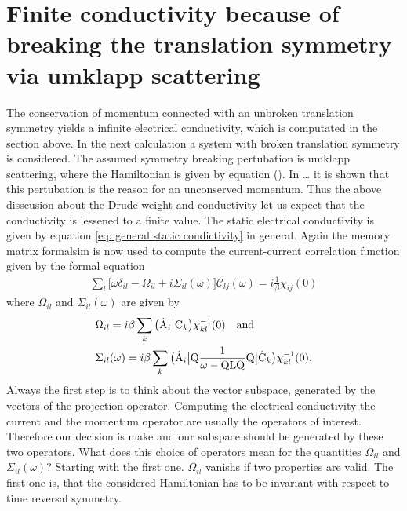 \section{Finite conductivity because of breaking the translation symmetry via umklapp scattering}
\label{sec: finite conductivity because of breaking the translation symmetry via umklapp scattering}
%
%
The conservation of momentum connected with an unbroken translation symmetry yields a infinite electrical conductivity, which is computated in the section above.
In the next calculation a system with broken translation symmetry is considered.
The assumed symmetry breaking pertubation is umklapp scattering, where the Hamiltonian is given by equation ().
In \dots{} it is shown that this pertubation is the reason for an unconserved momentum.
Thus the above disscusion about the Drude weight and conductivity let us expect that the conductivity is lessened to a finite value.
The static electrical conductivity is given by equation \eqref{eq: general static condictivity} in general.
Again the memory matrix formalsim is now used to compute the current-current correlation function given by the formal equation
%
\begin{align}
	\sum\limits_{l} \Big[\omega \delta_{il} - \Omega_{il} + i \Sigma_{il}(\omega)\Big] \mathcal{C}_{lj}(\omega) = i \frac{1}{\beta} \chi_{ij}(0)
\end{align}
%
where $\Omega_{il}$ and $\Sigma_{il}(\omega)$ are given by
%
\begin{align}
	&\Omega_{il} = i \beta \sum\limits_{k} \obraket{\dot{\mt{A}}_{i}}{\mt{C}_{k}} \chi_{kl}^{-1}(0) \qq{and} \\
	&\Sigma_{il}(\omega) = i \beta \sum\limits_{k} \obra{\dot{\mt{A}}_{i}} \mt{Q} \frac{1}{\omega - \mt{QLQ}} \mt{Q} \oket{\dot{\mt{C}}_{k}} \chi_{kl}^{-1}(0).
\end{align}
%
Always the first step is to think about the vector subspace, generated by the vectors of the projection operator.
Computing the electrical conductivity the current and the momentum operator are usually the operators of interest. 
Therefore our decision is make and our subspace should be generated by these two operators.
What does this choice of operators mean for the quantities $\Omega_{il}$ and $\Sigma_{il}(\omega)$?
Starting with the first one.
$\Omega_{il}$ vanishs if two properties are valid.
The first one is, that the considered Hamiltonian has to be invariant with respect to time reversal symmetry.
